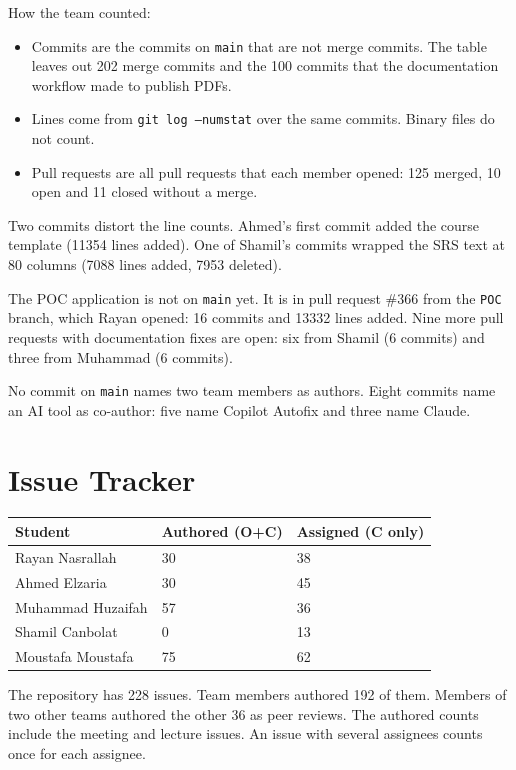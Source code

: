 \documentclass{article}
\begin{document}
How the team counted:

\begin{itemize}
    \item Commits are the commits on \texttt{main} that are not merge
    commits. The table leaves out 202 merge commits and the 100 commits that
    the documentation workflow made to publish PDFs.
    \item Lines come from \texttt{git log --numstat} over the same commits.
    Binary files do not count.
    \item Pull requests are all pull requests that each member opened:
    125 merged, 10 open and 11 closed without a merge.
\end{itemize}

Two commits distort the line counts. Ahmed's first commit added the course
template (11354 lines added). One of Shamil's commits wrapped the SRS text at
80 columns (7088 lines added, 7953 deleted).

The POC application is not on \texttt{main} yet. It is in pull request
\#366 from the \texttt{POC} branch, which Rayan opened: 16 commits and
13332 lines added. Nine more pull requests with documentation fixes are
open: six from Shamil (6 commits) and three from Muhammad (6 commits).

No commit on \texttt{main} names two team members as authors. Eight commits
name an AI tool as co-author: five name Copilot Autofix and three name
Claude.

\section{Issue Tracker}

\begin{table}[H]
\centering
\begin{tabular}{lll}
\toprule
\textbf{Student} & \textbf{Authored (O+C)} & \textbf{Assigned (C only)}\\
\midrule
Rayan Nasrallah & 30 & 38 \\
Ahmed Elzaria & 30 & 45 \\
Muhammad Huzaifah & 57 & 36 \\
Shamil Canbolat & 0 & 13 \\
Moustafa Moustafa & 75 & 62 \\
\bottomrule
\end{tabular}
\end{table}

The repository has 228 issues. Team members authored 192 of them. Members of
two other teams authored the other 36 as peer reviews. The authored counts
include the meeting and lecture issues. An issue with several assignees
counts once for each assignee.
\end{document}
